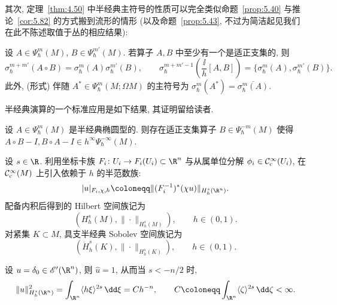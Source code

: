 其次, 定理~\ref{thm:4.50} 中半经典主符号的性质可以完全类似命题~\ref{prop:5.40} 与推论~\ref{cor:5.82} 的方式搬到流形的情形 (以及命题~\ref{prop:5.43}, 不过为简洁起见我们在此不陈述取值于丛的相应结果):

\begin{proposition}[半经典主符号]\label{prop:5.87}
设 $A \in \Psi_\hbar^m(M)$, $B \in \Psi_\hbar^{m'}(M)$. 若算子 $A, B$ 中至少有一个是适正支集的, 则
\begin{equation}\label{eq:5.202}
    \sigma_\hbar^{m+m'}(A \circ B) = \sigma_\hbar^m(A) \sigma_\hbar^{m'}(B), \qquad \sigma_\hbar^{m+m'-1}\left( \frac{\ii}{h} [A, B] \right) = \{\sigma_\hbar^m(A), \sigma_\hbar^{m'}(B)\}.
\end{equation}
此外, (形式) 伴随 $A^* \in \Psi_\hbar^m(M; \Omega M)$ 的主符号为 $\sigma_\hbar^m(A^*) = \overline{\sigma_\hbar^m(A)}$.
\end{proposition}

半经典演算的一个标准应用是如下结果, 其证明留给读者.

\begin{theorem}[半经典椭圆拟逆]\label{thm:5.88}
设 $A \in \Psi_\hbar^m(M)$ 是半经典椭圆型的. 则存在适正支集算子 $B \in \Psi_\hbar^{-m}(M)$ 使得 $A \circ B - I, B \circ A - I \in h^\infty \Psi_\hbar^{-\infty}(M)$.
\end{theorem}

\begin{definition}\label{def:5.89}
设 $s \in \R$. 利用坐标卡族 $F_i \colon U_i \to F_i(U_i) \subset \R^n$ 与从属单位分解 $\phi_i \in \mathcal{C}_{\mathrm{c}}^\infty(U_i)$, 在 $\mathcal{C}_{\mathrm{c}}^\infty(M)$ 上引入依赖于 $h$ 的半范数族:
\begin{equation}\label{eq:5.203}
    |u|_{F_i, \chi, h} \defeq \|(F_i^{-1})^*(\chi u)\|_{H_h^s(\R^n)}.
\end{equation}
配备内积后得到的 Hilbert 空间族记为
\begin{equation}\label{eq:5.204}
    (H_h^s(M), \|\cdot\|_{H_h^s(M)}), \qquad h \in (0, 1).
\end{equation}
对紧集 $K \subset M$, 具支半经典 Sobolev 空间族记为
\begin{equation}\label{eq:5.205}
    (\dot{H}_h^s(K), \|\cdot\|_{H_h^s(K)}), \qquad h \in (0, 1).
\end{equation}
\end{definition}

\begin{example}\label{eg:5.90}
设 $u = \delta_0 \in \mathscr{E}'(\R^n)$, 则 $\hat{u} = 1$, 从而当 $s < -n/2$ 时,
\begin{equation}\label{eq:5.206}
    \|u\|_{H_h^s(\R^n)}^2 = \int_{\R^n} \langle h \xi \rangle^{2s} \,\dd\xi = C h^{-n}, \qquad C \defeq \int_{\R^n} \langle \zeta \rangle^{2s} \,\dd\zeta < \infty.
\end{equation}
\end{example}

